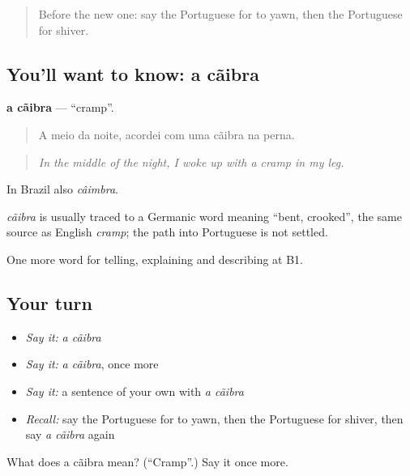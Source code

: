 \label{lesson:PT-C489-caibra}



\begin{quote}
Before the new one: say the Portuguese for to yawn, then the Portuguese for shiver.
\end{quote}

\subsection*{You'll want to know: a cãibra}
\textbf{a cãibra} — \textquotedblleft{}cramp\textquotedblright{}.

\begin{quote}
A meio da noite, acordei com uma cãibra na perna.
\end{quote}

\begin{quote}
\emph{In the middle of the night, I woke up with a cramp in my leg.}
\end{quote}

In Brazil also \emph{câimbra}.

\begin{cousinweb}
\emph{cãibra} is usually traced to a Germanic word meaning \textquotedblleft{}bent, crooked\textquotedblright{}, the same source as English \emph{cramp}; the path into Portuguese is not settled.
\end{cousinweb}

\begin{grammarlens}[title={What you've built}]
One more word for telling, explaining and describing at B1.
\end{grammarlens}

\subsection*{Your turn}
\begin{itemize}
\raggedright
  \item \emph{Say it:} \emph{a cãibra}
  \item \emph{Say it:} \emph{a cãibra}, once more
  \item \emph{Say it:} a sentence of your own with \emph{a cãibra}
  \item \emph{Recall:} say the Portuguese for to yawn, then the Portuguese for shiver, then say \emph{a cãibra} again
\end{itemize}

\begin{tcolorbox}[breakable,colback=teal!4,colframe=teal!35!black,title={Before you move on}]
What does a cãibra mean? (\textquotedblleft{}Cramp\textquotedblright{}.) Say it once more.
\end{tcolorbox}
